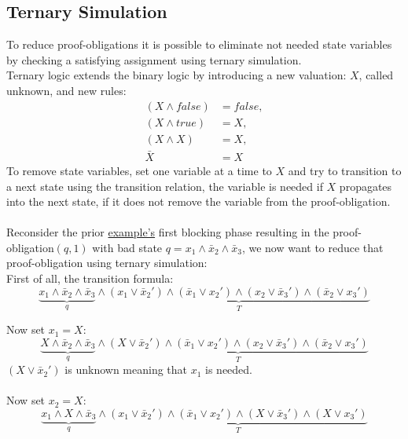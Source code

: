 \documentclass[11pt, a4paper, BCOR=10mm, ngerman, oneside]{scrbook}
\begin{document}
\subsection{Ternary Simulation}
To reduce proof-obligations it is possible to eliminate not needed state variables by checking a satisfying assignment using ternary simulation. \\
Ternary logic extends the binary logic by introducing a new valuation: $X$, called unknown, and new rules:
\begin{align*}
(X \land false) &= false, \\ (X \land true) &= X, \\ (X \land X) &= X, \\ \bar X &= X
\end{align*}
To remove state variables, set one variable at a time to $X$ and try to transition to a next state using the transition relation, the variable is needed if $X$ propagates into the next state, if it does not remove the variable from the proof-obligation. \\ \\
Reconsider the prior \hyperref[ex2]{example's} first blocking phase resulting in the proof-obligation$(q, 1)$ with bad state $q = x_1 \land \bar x_2 \land \bar x_3$, we now want to reduce that proof-obligation using ternary simulation: \\

First of all, the transition formula:
\begin{equation*}
\underbrace{x_1 \land \bar x_2 \land \bar x_3}_{q} \land \underbrace{(x_1 \lor \bar x_2' ) \land ( \bar x_1 \lor x_2') \land (x_2 \lor \bar x_3') \land ( \bar x_2 \lor x_3')}_{T}
\end{equation*}

Now set $x_1 = X$: \\
\begin{equation*}
\underbrace{X \land \bar x_2 \land \bar x_3}_{q} \land \underbrace{(X \lor \bar x_2' ) \land ( \bar x_1 \lor x_2') \land (x_2 \lor \bar x_3') \land ( \bar x_2 \lor x_3')}_{T}
\end{equation*}
$(X \lor \bar x_2')$ is unknown meaning that $x_1$  is needed. \\ \\

Now set $x_2 = X$: \\
\begin{equation*}
\underbrace{x_1 \land X \land \bar x_3}_{q} \land \underbrace{(x_1 \lor \bar x_2' ) \land ( \bar x_1 \lor x_2') \land (X \lor \bar x_3') \land ( X \lor x_3')}_{T}
\end{equation*}
\end{document}
